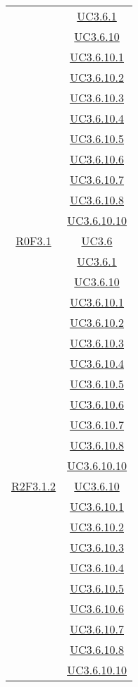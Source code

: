 \begin{longtable}{|c|c|}
& \hyperlink{UC3.6.1}{UC3.6.1}\\
& \hyperlink{UC3.6.10}{UC3.6.10}\\
& \hyperlink{UC3.6.10.1}{UC3.6.10.1}\\
& \hyperlink{UC3.6.10.2}{UC3.6.10.2}\\
& \hyperlink{UC3.6.10.3}{UC3.6.10.3}\\
& \hyperlink{UC3.6.10.4}{UC3.6.10.4}\\
& \hyperlink{UC3.6.10.5}{UC3.6.10.5}\\
& \hyperlink{UC3.6.10.6}{UC3.6.10.6}\\
& \hyperlink{UC3.6.10.7}{UC3.6.10.7}\\
& \hyperlink{UC3.6.10.8}{UC3.6.10.8}\\
& \hyperlink{UC3.6.10.10}{UC3.6.10.10}\\
\hline
\hyperlink{R0F3.1}{R0F3.1} & \hyperlink{UC3.6}{UC3.6}\\
& \hyperlink{UC3.6.1}{UC3.6.1}\\
& \hyperlink{UC3.6.10}{UC3.6.10}\\
& \hyperlink{UC3.6.10.1}{UC3.6.10.1}\\
& \hyperlink{UC3.6.10.2}{UC3.6.10.2}\\
& \hyperlink{UC3.6.10.3}{UC3.6.10.3}\\
& \hyperlink{UC3.6.10.4}{UC3.6.10.4}\\
& \hyperlink{UC3.6.10.5}{UC3.6.10.5}\\
& \hyperlink{UC3.6.10.6}{UC3.6.10.6}\\
& \hyperlink{UC3.6.10.7}{UC3.6.10.7}\\
& \hyperlink{UC3.6.10.8}{UC3.6.10.8}\\
& \hyperlink{UC3.6.10.10}{UC3.6.10.10}\\
\hline
\hyperlink{R2F3.1.2}{R2F3.1.2} & \hyperlink{UC3.6.10}{UC3.6.10}\\
& \hyperlink{UC3.6.10.1}{UC3.6.10.1}\\
& \hyperlink{UC3.6.10.2}{UC3.6.10.2}\\
& \hyperlink{UC3.6.10.3}{UC3.6.10.3}\\
& \hyperlink{UC3.6.10.4}{UC3.6.10.4}\\
& \hyperlink{UC3.6.10.5}{UC3.6.10.5}\\
& \hyperlink{UC3.6.10.6}{UC3.6.10.6}\\
& \hyperlink{UC3.6.10.7}{UC3.6.10.7}\\
& \hyperlink{UC3.6.10.8}{UC3.6.10.8}\\
& \hyperlink{UC3.6.10.10}{UC3.6.10.10}\\

\end{longtable}
